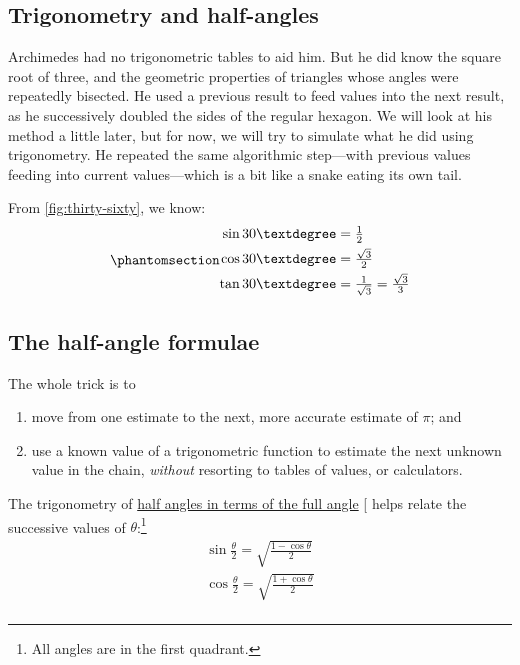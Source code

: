 \documentclass[
  a4paper,
]{article}
\begin{document}
\subsection{Trigonometry and
half-angles}\label{trigonometry-and-half-angles}

Archimedes had no trigonometric tables to aid him. But he did know the
square root of three, and the geometric properties of triangles whose
angles were repeatedly bisected. He used a previous result to feed
values into the next result, as he successively doubled the sides of the
regular hexagon. We will look at his method a little later, but for now,
we will try to simulate what he did using trigonometry. He repeated the
same algorithmic step---with previous values feeding into current
values---which is a bit like a snake eating its own tail.

From \cref{fig:thirty-sixty}, we know:
\begin{equation}\phantomsection\label{eq:three-six-nine}{
\begin{aligned}
\sin 30° &= \tfrac{1}{2}\\
\cos 30° &= \tfrac{\sqrt{3}}{2}\\
\tan 30° &= \tfrac{1}{\sqrt{3}} = \tfrac{\sqrt{3}}{3}\\
\end{aligned}
}\end{equation}

\subsection{The half-angle formulae}\label{the-half-angle-formulae}

The whole trick is to

\begin{enumerate}
\def\labelenumi{\alph{enumi}.}
\item
  move from one estimate to the next, more accurate estimate of \(\pi\);
  and
\item
  use a known value of a trigonometric function to estimate the next
  unknown value in the chain, \emph{without} resorting to tables of
  values, or calculators.
\end{enumerate}

The trigonometry of
\href{https://math.libretexts.org/Bookshelves/Algebra/Algebra_and_Trigonometry_1e_(OpenStax)/09:_Trigonometric_Identities_and_Equations/9.03:_Double-Angle_Half-Angle_and_Reduction_Formulas}{half
angles in terms of the full angle} {[}\citeproc{ref-half-angle}{5}{]}
helps relate the successive values of \(\theta\):\footnote{All angles
  are in the first quadrant.} \[
\begin{aligned}
\sin\frac{\theta}{2} = \sqrt{\frac{1 - \cos\theta}{2}}\\
\cos\frac{\theta}{2} = \sqrt{\frac{1 + \cos\theta}{2}}\\
\end{aligned}
\]
\end{document}
